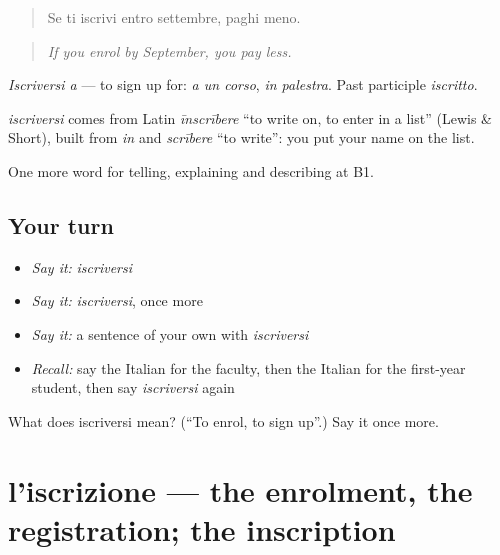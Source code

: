 \begin{quote}
Se ti iscrivi entro settembre, paghi meno.
\end{quote}

\begin{quote}
\emph{If you enrol by September, you pay less.}
\end{quote}

\emph{Iscriversi a} — to sign up for: \emph{a un corso}, \emph{in palestra}. Past participle \emph{iscritto}.

\begin{cousinweb}
\emph{iscriversi} comes from Latin \emph{īnscrībere} \textquotedblleft{}to write on, to enter in a list\textquotedblright{} (Lewis \& Short), built from \emph{in} and \emph{scrībere} \textquotedblleft{}to write\textquotedblright{}: you put your name on the list.
\end{cousinweb}

\begin{grammarlens}[title={What you've built}]
One more word for telling, explaining and describing at B1.
\end{grammarlens}

\subsection*{Your turn}
\begin{itemize}
\raggedright
  \item \emph{Say it:} \emph{iscriversi}
  \item \emph{Say it:} \emph{iscriversi}, once more
  \item \emph{Say it:} a sentence of your own with \emph{iscriversi}
  \item \emph{Recall:} say the Italian for the faculty, then the Italian for the first-year student, then say \emph{iscriversi} again
\end{itemize}

\begin{tcolorbox}[breakable,colback=teal!4,colframe=teal!35!black,title={Before you move on}]
What does iscriversi mean? (\textquotedblleft{}To enrol, to sign up\textquotedblright{}.) Say it once more.
\end{tcolorbox}
\section[l'iscrizione]{l'iscrizione — the enrolment, the registration; the inscription}

\label{lesson:IT-C380-iscrizione}



